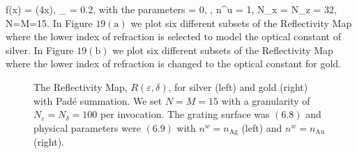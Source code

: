 \be
f(x) = \cos(4x),
\quad
\varepsilon_{} = 0.2,
\ee
with the parameters
\be
\alpha = 0,
\quad
{},
\quad
n^u = 1,
\quad
N_x = N_z = 32,
\quad
N=M=15.
\ee
In Figure $19(\text{a})$ we plot six different subsets of the Reflectivity
Map where the lower index of refraction is selected to model the optical constant
of silver. In Figure $19(\text{b})$ we plot six different subsets of 
the Reflectivity Map where the lower index of refraction is changed to the optical
constant for gold.
%
%
\vspace{-18mm}
\begin{figure}[H]
    \centering
    \vspace{3mm}
    \caption{The Reflectivity Map, $R(\varepsilon,\delta)$, for silver (left)
    and gold (right) with
    Pad\'e summation. We set $N=M=15$ with a granularity
    of $N_{\varepsilon}=N_{\delta}=100$ per invocation. The grating surface was $(6.8)$ and physical parameters were $(6.9)$ with $n^w = n_{\text{Ag}}$ (left)
    and $n^w = n_{\text{Au}}$ (right).}
    \label{Fig:RM:Metal}
\end{figure}
